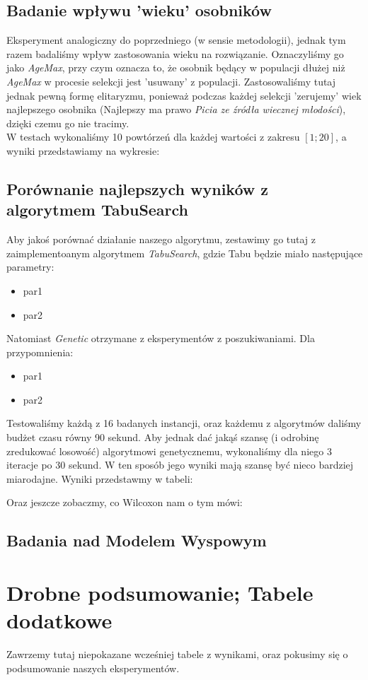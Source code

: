 \documentclass{article}
\begin{document}
\subsection{Badanie wpływu 'wieku' osobników}
Eksperyment analogiczny do poprzedniego (w sensie metodologii), jednak tym razem badaliśmy wpływ zastosowania wieku na rozwiązanie. Oznaczyliśmy go jako \textit{AgeMax}, przy czym oznacza to, że osobnik będący w populacji dłużej niż \textit{AgeMax} w procesie selekcji jest 'usuwany' z populacji. Zastosowaliśmy tutaj jednak pewną formę elitaryzmu, ponieważ podczas każdej selekcji 'zerujemy' wiek najlepszego osobnika (Najlepszy ma prawo \textit{Picia ze źródła wiecznej młodości}), dzięki czemu go nie tracimy.\\
W testach wykonaliśmy 10 powtórzeń dla każdej wartości z zakresu $[1 ; 20]$, a wyniki przedstawiamy na wykresie:


\subsection{Porównanie najlepszych wyników z algorytmem TabuSearch}
Aby jakoś porównać działanie naszego algorytmu, zestawimy go tutaj z zaimplementoanym algorytmem \textit{TabuSearch}, gdzie Tabu będzie miało następujące parametry:
\begin{itemize}
	\item par1
	\item par2
\end{itemize}
Natomiast \textit{Genetic} otrzymane z eksperymentów z poszukiwaniami. Dla przypomnienia:
\begin{itemize}
	\item par1
	\item par2
\end{itemize}
Testowaliśmy każdą z 16 badanych instancji, oraz każdemu z algorytmów daliśmy budżet czasu równy 90 sekund. Aby jednak dać jakąś szansę (i odrobinę zredukować losowość) algorytmowi genetycznemu, wykonaliśmy dla niego 3 iteracje po 30 sekund. W ten sposób jego wyniki mają szansę być nieco bardziej miarodajne. Wyniki przedstawmy w tabeli:

Oraz jeszcze zobaczmy, co Wilcoxon nam o tym mówi:

\subsection{Badania nad Modelem Wyspowym}

\section{Drobne podsumowanie; Tabele dodatkowe}
Zawrzemy tutaj niepokazane wcześniej tabele z wynikami, oraz pokusimy się o podsumowanie naszych eksperymentów.
\end{document}
